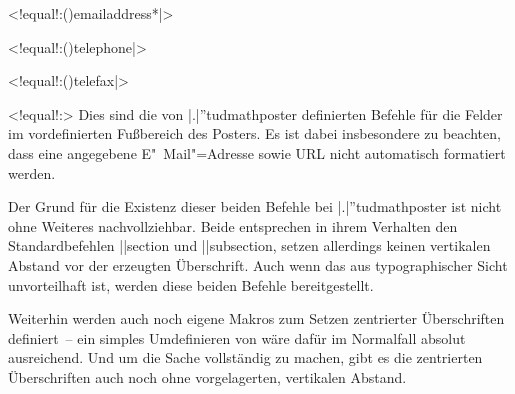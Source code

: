 \begin{DeclareEntity}{}
\begin{NoIndexDefault}
\begin{Declaration}
  {}
  <!equal!:\Macro(){emailaddress*|}>
\begin{Declaration}
  {}
  <!equal!:\Macro(){telephone|}>
\begin{Declaration}
  {}
  <!equal!:\Macro(){telefax|}>
\begin{Declaration}
  {}
  <!equal!:>
\printdeclarationlist
%
Dies sind die von \Class|.|''{tudmathposter} definierten Befehle für die Felder 
im vordefinierten Fußbereich des Posters. Es ist dabei insbesondere zu 
beachten, dass eine angegebene E"~Mail"=Adresse sowie URL nicht automatisch 
formatiert werden.
\end{Declaration}
\end{Declaration}
\end{Declaration}
\end{Declaration}

\begin{Declaration}
  {}
\begin{Declaration}
  {}
\printdeclarationlist
%
Der Grund für die Existenz dieser beiden Befehle bei \Class|.|''{tudmathposter} 
ist nicht ohne Weiteres nachvollziehbar. Beide entsprechen in ihrem Verhalten 
den Standardbefehlen \Macro||{section} und \Macro||{subsection}, setzen 
allerdings keinen vertikalen Abstand vor der erzeugten Überschrift. Auch wenn 
das aus typographischer Sicht unvorteilhaft ist, werden diese beiden Befehle 
bereitgestellt.
\end{Declaration}
\end{Declaration}

\begin{Declaration}
  {}
\begin{Declaration}
  {}
\begin{Declaration}
  {}
\begin{Declaration}
  {}
\printdeclarationlist
%
Weiterhin werden auch noch eigene Makros zum Setzen zentrierter Überschriften 
definiert~-- ein simples Umdefinieren von  wäre dafür im 
Normalfall absolut ausreichend. Und um die Sache vollständig zu machen, gibt es 
die zentrierten Überschriften auch noch ohne vorgelagerten, vertikalen Abstand.
\end{Declaration}
\end{Declaration}
\end{Declaration}
\end{Declaration}


\end{NoIndexDefault}
\end{DeclareEntity}
